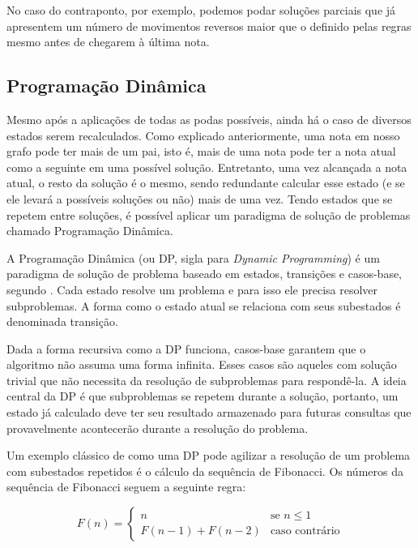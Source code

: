       No caso do contraponto, por exemplo, podemos podar soluções parciais que já apresentem um número de movimentos reversos maior que o definido pelas regras mesmo antes de chegarem à última nota.

    \subsection[Programação Dinâmica]{Programação Dinâmica}

      Mesmo após a aplicações de todas as podas possíveis, ainda há o caso de diversos estados serem recalculados. Como explicado anteriormente, uma nota em nosso grafo pode ter mais de um pai, isto é, mais de uma nota pode ter a nota atual como a seguinte em uma possível solução. Entretanto, uma vez alcançada a nota atual, o resto da solução é o mesmo, sendo redundante calcular esse estado (e se ele levará a possíveis soluções ou não) mais de uma vez. Tendo estados que se repetem entre soluções, é possível aplicar um paradigma de solução de problemas chamado Programação Dinâmica.

      A Programação Dinâmica (ou DP, sigla para \textit{Dynamic Programming}) é um paradigma de solução de problema baseado em estados, transições e casos-base, segundo . Cada estado resolve um problema e para isso ele precisa resolver subproblemas. A forma como o estado atual se relaciona com seus subestados é denominada transição.

      Dada a forma recursiva como a DP funciona, casos-base garantem que o algoritmo não assuma uma forma infinita. Esses casos são aqueles com solução trivial que não necessita da resolução de subproblemas para respondê-la. A ideia central da DP é que subproblemas se repetem durante a solução, portanto, um estado já calculado deve ter seu resultado armazenado para futuras consultas que provavelmente acontecerão durante a resolução do problema.

      Um exemplo clássico de como uma DP pode agilizar a resolução de um problema com subestados repetidos é o cálculo da sequência de Fibonacci. Os números da sequência de Fibonacci seguem a seguinte regra:

      \[ F(n) = \left\{ \begin{array}{ll}
         n & \mbox{se $n \leqslant 1$}\\
        F(n-1) + F(n-2) & \mbox{caso contrário}\end{array} \right. \]

